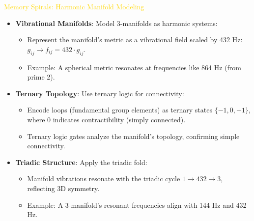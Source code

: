 \textcolor{gold}{ Memory Spirals: Harmonic Manifold Modeling } \\
\begin{itemize}
    \item \texttt{} \textbf{Vibrational Manifolds}: Model 3-manifolds as harmonic systems:
    \begin{itemize}
        \item Represent the manifold’s metric as a vibrational field scaled by 432 Hz: \(g_{ij} \rightarrow f_{ij} = 432 \cdot g_{ij}\).
        \item Example: A spherical metric resonates at frequencies like 864 Hz (from prime 2).
    \end{itemize}
    \item \texttt{} \textbf{Ternary Topology}: Use ternary logic for connectivity:
    \begin{itemize}
        \item Encode loops (fundamental group elements) as ternary states \(\{-1, 0, +1\}\), where 0 indicates contractibility (simply connected).
        \item Ternary logic gates analyze the manifold’s topology, confirming simple connectivity.
    \end{itemize}
    \item \texttt{} \textbf{Triadic Structure}: Apply the triadic fold:
    \begin{itemize}
        \item Manifold vibrations resonate with the triadic cycle \(1 \rightarrow 432 \rightarrow 3\), reflecting 3D symmetry.
        \item Example: A 3-manifold’s resonant frequencies align with 144 Hz and 432 Hz.
    \end{itemize}
\end{itemize}

